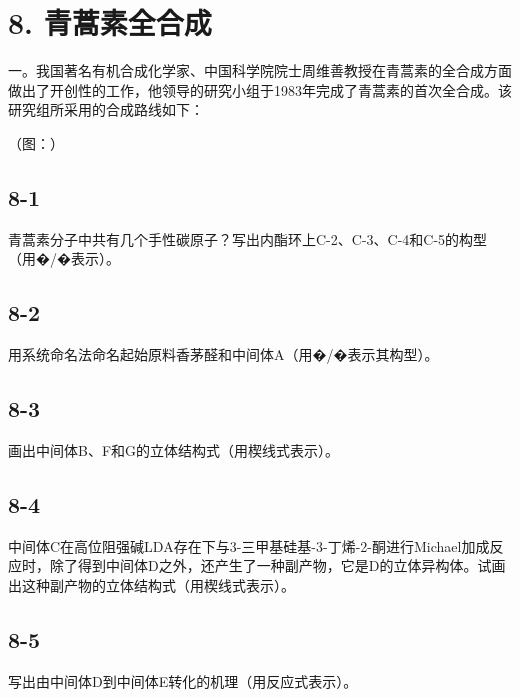 \section*{8. 青蒿素全合成}
⼀。我国著名有机合成化学家、中国科学院院⼠周维善教授在⻘蒿素的全合成⽅⾯做出了开创性的⼯作，他领导的研究⼩组于1983年完成了⻘蒿素的⾸次全合成。该研究组所采⽤的合成路线如下：

（图：）

\subsection*{8-1}
⻘蒿素分⼦中共有⼏个⼿性碳原⼦？写出内酯环上C-2、C-3、C-4和C-5的构型（⽤�/�表⽰）。

\subsection*{8-2}
⽤系统命名法命名起始原料⾹茅醛和中间体A（⽤�/�表⽰其构型）。

\subsection*{8-3}
画出中间体B、F和G的⽴体结构式（⽤楔线式表⽰）。

\subsection*{8-4}
中间体C在⾼位阻强碱LDA存在下与3-三甲基硅基-3-丁烯-2-酮进⾏Michael加成反应时，除了得到中间体D之外，还产⽣了⼀种副产物，它是D的⽴体异构体。试画出这种副产物的⽴体结构式（⽤楔线式表⽰）。

\subsection*{8-5}
写出由中间体D到中间体E转化的机理（⽤反应式表⽰）。
